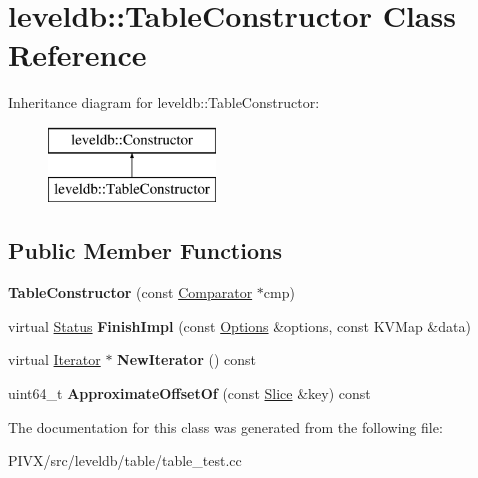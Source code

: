 \hypertarget{classleveldb_1_1_table_constructor}{}\section{leveldb\+:\+:Table\+Constructor Class Reference}
\label{classleveldb_1_1_table_constructor}
Inheritance diagram for leveldb\+:\+:Table\+Constructor\+:\begin{figure}[H]
\begin{center}
\leavevmode
\includegraphics[height=2.000000cm]{classleveldb_1_1_table_constructor}
\end{center}
\end{figure}
\subsection*{Public Member Functions}
\begin{DoxyCompactItemize}
\item 
\mbox{\label{classleveldb_1_1_table_constructor_acfc791dc15a8fac77f9715fda659eb19}} 
{\bfseries Table\+Constructor} (const \mbox{\hyperlink{structleveldb_1_1_comparator}{Comparator}} $\ast$cmp)
\item 
\mbox{\label{classleveldb_1_1_table_constructor_aa8ce3799a55859c2dee50d3e08f56ef2}} 
virtual \mbox{\hyperlink{classleveldb_1_1_status}{Status}} {\bfseries Finish\+Impl} (const \mbox{\hyperlink{structleveldb_1_1_options}{Options}} \&options, const K\+V\+Map \&data)
\item 
\mbox{\label{classleveldb_1_1_table_constructor_ac01be8f3173a137d7f5c3c94ba699075}} 
virtual \mbox{\hyperlink{classleveldb_1_1_iterator}{Iterator}} $\ast$ {\bfseries New\+Iterator} () const
\item 
\mbox{\label{classleveldb_1_1_table_constructor_afceedae5bc8e477c94f1b7a3afb726a2}} 
uint64\+\_\+t {\bfseries Approximate\+Offset\+Of} (const \mbox{\hyperlink{classleveldb_1_1_slice}{Slice}} \&key) const
\end{DoxyCompactItemize}


The documentation for this class was generated from the following file\+:\begin{DoxyCompactItemize}
\item 
P\+I\+V\+X/src/leveldb/table/table\+\_\+test.\+cc\end{DoxyCompactItemize}

